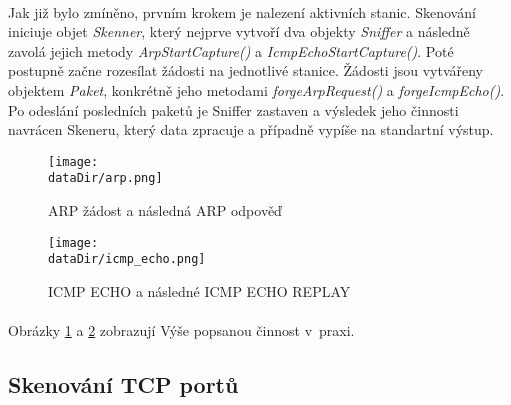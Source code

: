 \documentclass[a4paper,11pt,onecolumn,notitlepage]{article}
\def \dataDir {data}
\begin{document}
\paragraph{} Jak již bylo zmíněno, prvním krokem je nalezení aktivních stanic. Skenování iniciuje objet \emph{Skenner}, který nejprve vytvoří dva objekty \emph{Sniffer} a následně zavolá jejich metody \emph{ArpStartCapture()} a \emph{IcmpEchoStartCapture()}. Poté postupně začne rozesílat žádosti na jednotlivé stanice. Žádosti jsou vytvářeny objektem \emph{Paket}, konkrétně jeho metodami \emph{forgeArpRequest()} a \emph{forgeIcmpEcho()}. Po odeslání posledních paketů je Sniffer zastaven a výsledek jeho činnosti navrácen Skeneru, který data zpracuje a případně vypíše na standartní výstup.
\begin{figure}[h]
    \centering
    \texttt{[image: \\dataDir/arp.png]}
    \caption{ARP žádost a následná ARP odpověď\label{fig:SHARK_ARP}}
\end{figure}
\begin{figure}[h]
    \centering
    \texttt{[image: \\dataDir/icmp\_echo.png]}
    \caption{ICMP ECHO a následné ICMP ECHO REPLAY\label{fig:SHARK_ICMP_ECHO}}
\end{figure}
\paragraph{} Obrázky \ref{fig:SHARK_ARP} a \ref{fig:SHARK_ICMP_ECHO} zobrazují Výše popsanou činnost v~praxi.
\subsection{Skenování TCP portů}
\end{document}
